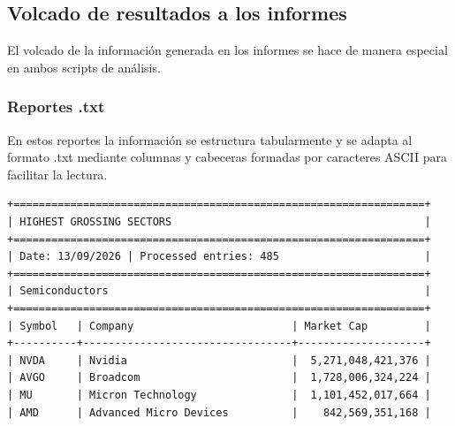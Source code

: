 \documentclass[11pt,a4paper]{article}
\begin{document}
\subsection{Volcado de resultados a los informes}

El volcado de la información generada en los informes se hace de manera especial en ambos scripts de análisis.

\subsubsection{Reportes .txt}

En estos reportes la información se estructura tabularmente y se adapta al formato .txt mediante columnas y cabeceras formadas por caracteres ASCII para facilitar la lectura.

\begin{center}
\begin{minipage}{0.7575\textwidth}
\begin{lstlisting}
+=================================================================+
| HIGHEST GROSSING SECTORS                                        |
+=================================================================+
| Date: 13/09/2026 | Processed entries: 485                       |
+=================================================================+
| Semiconductors                                                  |
+=================================================================+
| Symbol   | Company                         | Market Cap         |
+----------+---------------------------------+--------------------+
| NVDA     | Nvidia                          |  5,271,048,421,376 |
| AVGO     | Broadcom                        |  1,728,006,324,224 |
| MU       | Micron Technology               |  1,101,452,017,664 |
| AMD      | Advanced Micro Devices          |    842,569,351,168 |
\end{lstlisting}
\end{minipage}
\end{center}
\end{document}
